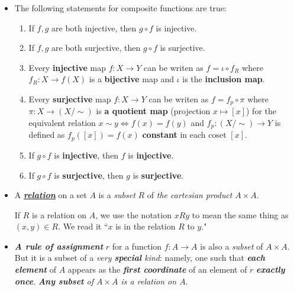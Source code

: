 \documentclass[11pt]{article}
\begin{document}
\begin{itemize}
\item \begin{proposition}
The following statements for composite functions are true:
\begin{enumerate}
\item If $f, g$ are both injective, then $g \circ f$ is injective. 
\item If $f, g$ are both surjective, then $g \circ f$ is surjective. 
\item Every \textbf{injective} map $f: X \rightarrow Y$ can be writen as $f = \iota \circ f_{R}$ where $f_R: X \rightarrow f(X)$ is a \textbf{bijective} map and $\iota$ is the \textbf{inclusion map}.
\item Every \textbf{surjective} map $f: X \rightarrow Y$ can be writen as $f =  f_{p} \circ \pi$ where $\pi: X\rightarrow (X/\sim)$ is \textbf{a quotient map} (projection $x \mapsto [x]$) for the equivalent relation $ x \sim y \Leftrightarrow f(x) = f(y)$ and  $f_p: (X/\sim) \rightarrow Y$ is defined as $f_p([x]) = f(x)$ \textbf{constant} in each coset $[x]$.
\item If $g \circ f$ is \textbf{injective}, then $f$ is \textbf{injective}.
\item If $g \circ f$ is \textbf{surjective}, then $g$ is \textbf{surjective}.
\end{enumerate}
\end{proposition}

\item \begin{definition}
A \underline{\emph{\textbf{relation}}} on a set $A$ is a \emph{subset} $R$ of \emph{the cartesian product} $A \times A$.

If $R$ is a relation on $A$, we use the notation $xRy$ to mean the same thing as $(x, y) \in R$. We read it ``$x$ is in the relation $R$ to $y$."
\end{definition}

\item \begin{remark}
\emph{\textbf{A rule of assignment}} $r$ for a function $f: A \rightarrow A$ is also a \emph{subset} of $A \times A$. But it is a subset of a \emph{very \textbf{special} kind}: namely, one such that \emph{\textbf{each element}} of $A$ appears as the \emph{\textbf{first coordinate}} of an element of $r$ \emph{\textbf{exactly once}}. \emph{\textbf{Any subset} of $A \times A$ is a relation on $A$}.
\end{remark}


\end{itemize}
\end{document}
